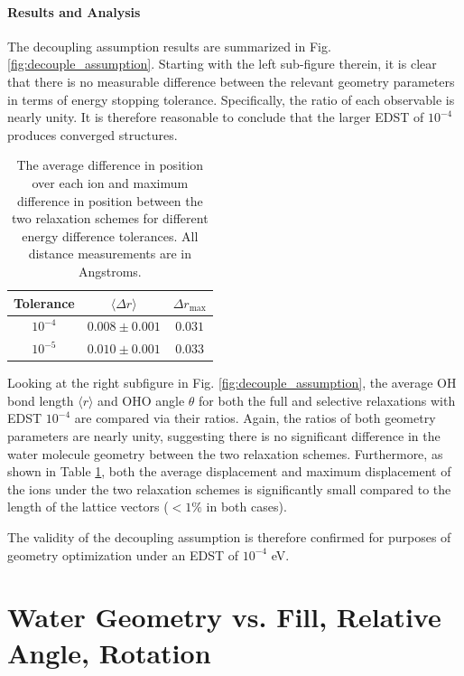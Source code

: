         \paragraph{Results and Analysis} The decoupling assumption results are summarized in Fig. \ref{fig:decouple_assumption}. Starting with the left sub-figure therein, it is clear that there is no measurable difference between the relevant geometry parameters in terms of energy stopping tolerance. Specifically, the ratio of each observable is nearly unity. It is therefore reasonable to conclude that the larger EDST of $10^{-4}$ produces converged structures.
        
        \begin{table}[]
            \centering
            \begin{tabular}{c|c|c}
               Tolerance  & $\langle \Delta r \rangle$ & $\Delta r_\text{max}$  \\
               \hline
               \hline
                $10^{-4}$ & $0.008\pm 0.001$ & $0.031$  \\ 
                $10^{-5}$ & $0.010\pm0.001$& $0.033$ \\ 
            \end{tabular}
            \caption{The average difference in position over each ion and maximum difference in position between the two relaxation schemes for different energy difference tolerances. All distance measurements are in Angstroms.}
            \label{tab:ediff_r_diff}
        \end{table}
        
        Looking at the right subfigure in Fig. \ref{fig:decouple_assumption}, the average OH bond length $\langle r \rangle$ and OHO angle $\theta$ for both the full and selective relaxations with EDST $10^{-4}$ are compared via their ratios. Again, the ratios of both geometry parameters are nearly unity, suggesting there is no significant difference in the water molecule geometry between the two relaxation schemes. Furthermore, as shown in Table \ref{tab:ediff_r_diff}, both the average displacement and maximum displacement of the ions under the two relaxation schemes is significantly small compared to the length of the lattice vectors ($<1\%$ in both cases). 
        
        The validity of the decoupling assumption is therefore confirmed for purposes of geometry optimization under an EDST of $10^{-4}$ eV.
        
        
    \section{Water Geometry vs. Fill, Relative Angle, Rotation}
    \label{sec:geo_opt}
    
